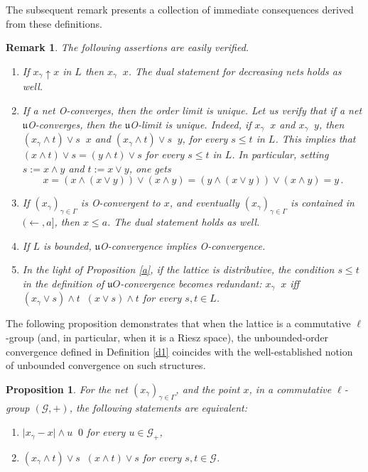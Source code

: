 \documentclass[12pt,a4paper]{amsart}
\numberwithin{equation}{section}
\newtheorem{prop}[thm]{Proposition}
\newtheorem{remark}{Remark}
\theoremstyle{definition}
\newcommand{\converges}[1]{\mathop{\overset{\text{#1}}{\longrightarrow}}}
\begin{document}
The subsequent remark presents a collection of immediate consequences derived from these definitions.


\begin{remark}\label{remark}
The following assertions are easily verified. 
\begin{enumerate}[{\rm(i)}]
    \item If $x_{\gamma}\uparrow x$ in  $L$ then $x_{\gamma} \converges{O} x $.  The dual statement for decreasing nets holds as well.  \\    
    \item If a net O-converges, then the order limit is unique. Let us verify that if a net $\mathfrak{u}$O-converges, then the $\mathfrak{u}$O-limit is unique.  Indeed, if $x_\gamma\converges{$\mathfrak{u}O$}x$ and $x_\gamma\converges{$\mathfrak{u}O$}y$, then $(x_\gamma\wedge t)\vee s\converges{O} x$ and $(x_\gamma\wedge t)\vee s\converges{O} y$, for every $s\le t$ in $L$.  This implies that $(x\wedge t)\vee s=(y \wedge t)\vee s$ for every $s\le t$ in $L$.  In particular, setting $s:=x\wedge y$ and $t:=x\vee y$, one gets
        \[x=(x\wedge(x\vee y))\vee(x\wedge y)=(y\wedge(x\vee y))\vee(x\wedge y)=y\,.\]
     \smallskip
    \item If $(x_\gamma)_{\gamma\in \Gamma}$ is O-convergent to $x$, and eventually $(x_\gamma)_{\gamma\in\Gamma}$ is contained in $(\leftarrow, a]$, then $x\le a$.  The dual statement holds as well.\\
    \item If $L$ is bounded,  $\mathfrak u$O-convergence  implies O-convergence.\\
    \item In the light of Proposition \ref{a},  if the lattice is distributive, the condition $s \leq t$ in the definition of $\mathfrak{u}O$-convergence becomes redundant: $x_\gamma\converges{$\mathfrak u$O}x$ iff $(x_{\gamma} \vee s) \wedge t  \converges{O} (x \vee s) \wedge t$ for every $s,t \in L$.  
   \end{enumerate}
 \end{remark}
 




The following proposition demonstrates that when the lattice is a commutative $\ell$-group (and, in particular, when it is a Riesz space), the unbounded-order convergence defined in Definition \ref{d1} coincides with the well-established notion of unbounded convergence on such structures.


\begin{prop}\cite[Prop. 7.2]{Papangelou Fredos}\label{2}
	For the net $(x_\gamma)_{\gamma \in \Gamma}$, and the point $x$, in a commutative $\ell$-group $(\mathscr G,+)$, the following  statements are equivalent:
 \begin{enumerate}[{\rm(i)}]
     \item $\vert x_{\gamma} - x \vert\wedge u  \converges{O} 0 $ for every $u \in \mathscr G_{+}$,
     \item $(x_{\gamma} \wedge t) \vee s  \converges{O} (x \wedge t) \vee s$ for every $s,t \in \mathscr{G}$.
 \end{enumerate}
\end{prop}
\end{document}
